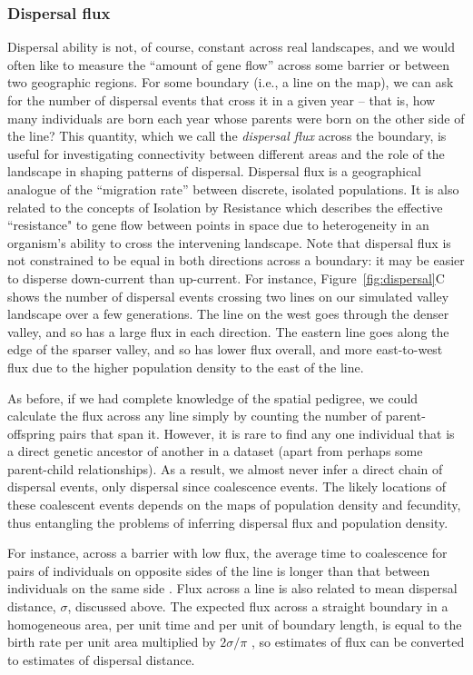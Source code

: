 \documentclass{ar-1col}
\begin{document}
\subsubsection{Dispersal flux}

Dispersal ability is not, of course, constant across real landscapes, and
we would often like to measure the ``amount of gene flow'' across some barrier
or between two geographic regions.
For some boundary (i.e., a line on the map),
we can ask for the number of dispersal events that cross it in a given year -- 
that is, 
how many individuals are born each year whose parents
were born on the other side of the line?
This quantity, which we call the \textit{dispersal flux} across the boundary,
is useful for investigating connectivity between different areas
and the role of the landscape in shaping patterns of dispersal.
Dispersal flux is a geographical analogue of
the ``migration rate'' between discrete, isolated populations. 
It is also related to the concepts of Isolation by Resistance 
\citep{McRae2006,McRae_Beier_2007,McRae2008,petkova2016visualizing} 
which describes the effective ``resistance" to gene flow 
between points in space due to heterogeneity 
in an organism's ability to cross the intervening landscape.
Note that dispersal flux is not constrained to be equal in both directions across a boundary:
it may be easier to disperse down-current than up-current.
For instance, Figure~\ref{fig:dispersal}C
shows the number of dispersal events crossing two lines on our simulated valley landscape
over a few generations.
The line on the west goes through the denser valley, 
and so has a large flux in each direction.
The eastern line goes along the edge of the sparser valley,
and so has lower flux overall, and more east-to-west flux
due to the higher population density to the east of the line.

As before, if we had complete knowledge of the spatial pedigree,
we could calculate the flux across any line simply by counting the number of
parent-offspring pairs that span it.
However, it is rare to find any one individual
that is a direct genetic ancestor of another in a dataset
(apart from perhaps some parent-child relationships).
As a result, we almost never infer a direct chain of dispersal events,
only dispersal since coalescence events.
The likely locations of these coalescent events
depends on the maps of population density and fecundity,
thus entangling
the problems of inferring dispersal flux and population density.

For instance, across a barrier with low flux,
the average time to coalescence for pairs of individuals on opposite sides of the line
is longer than that between individuals on the same side \citep{bedassle,Duforet-Frebourg_Blum_2014,ringbauer2018estimating}.
Flux across a line is also related to mean dispersal distance, $\sigma$, discussed above.
The expected flux across a straight boundary in a homogeneous area,
per unit time and per unit of boundary length,
is equal to the birth rate per unit area multiplied by $2 \sigma / \pi$
\citep{buffon1777},
so estimates of flux can be converted to estimates of dispersal distance.
\end{document}
